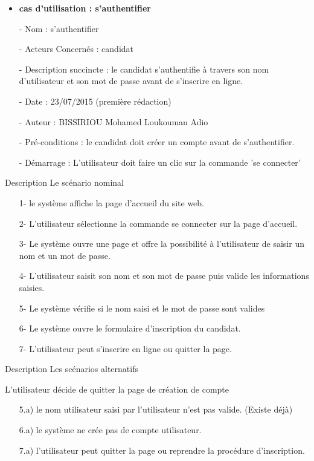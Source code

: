 	
	\begin{itemize}
	\item \textbf{cas d'utilisation : s'authentifier}
	\item[-]Nom : s'authentifier
	\item[-]Acteurs Concernés : candidat
	\item[-]Description succincte : le candidat s'authentifie à travers son nom d'utilisateur et son mot de passe avant de s'inscrire en ligne.
	\item[-]Date : 23/07/2015 (première rédaction)
	\item[-]Auteur : BISSIRIOU Mohamed Loukouman Adio
	\item[-]Pré-conditions : le candidat doit créer un compte avant de 	s'authentifier. 
	\item[-]Démarrage : L'utilisateur doit faire un clic sur la commande 'se connecter'
	\end{itemize}
	\begin{bf}
	Description 
	\newline
	Le scénario nominal
	\end{bf}
	\begin{itemize}
	\item[1-]le système affiche la page d'accueil du site web.
	\item[2-]L'utilisateur sélectionne la commande se connecter sur la page d’accueil.
	\item[3-]Le système ouvre une page et offre la possibilité à l’utilisateur de saisir un nom et un mot de passe.
	\item[4-]L'utilisateur saisit son nom et son mot de passe puis valide les informations saisies. 
	\item[5-]Le système vérifie si le nom saisi et le mot de passe sont valides
	\item[6-]Le système ouvre le formulaire d'inscription du candidat.
	\item[7-]L'utilisateur peut s'inscrire en ligne ou quitter la page.
	\end{itemize}
	\begin{bf}
		Description
		Les scénarios alternatifs 
	\end{bf}
	L'utilisateur décide de quitter la page de création de compte
	\begin{itemize}
		\item[]5.a) le nom utilisateur saisi par l'utilisateur n'est pas valide. (Existe déjà)
	\item[]6.a) le système ne crée pas de compte utilisateur.
	\item[]7.a) l'utilisateur peut quitter la page ou reprendre la procédure d'inscription.
	\end{itemize}
	
